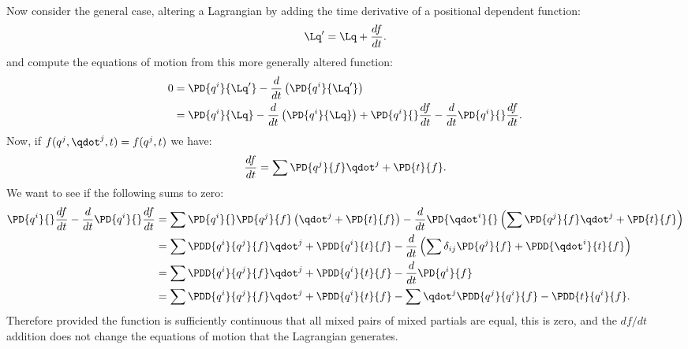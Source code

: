 {\begin{equation}
\begin{aligned}
\end{aligned}
\end{equation}
%
Now consider the general case, altering a Lagrangian by adding the time derivative of a positional dependent function:
%
\begin{equation}\label{eqn:tongMf1:1600}
\Lq' = \Lq + \frac{df}{dt}.
\end{equation}
%
and compute the equations of motion from this more generally altered function:
\begin{equation}\label{eqn:tongMf1:540}
\begin{aligned}
0
&= \PD{q^i}{\Lq'} - \frac{d}{dt}\left(\PD{q^i}{\Lq'}\right) \\
&= \PD{q^i}{\Lq} - \frac{d}{dt}\left(\PD{q^i}{\Lq}\right)
+ \PD{q^i}{}\frac{df}{dt} - \frac{d}{dt} \PD{q^i}{} \frac{df}{dt} .
\end{aligned}
\end{equation}
%
Now, if \(f(q^j,\qdot^j,t) = f(q^j,t)\) we have:
\begin{equation}\label{eqn:tongMf1:1620}
\frac{df}{dt} = \sum \PD{q^j}{f} \qdot^j + \PD{t}{f}.
\end{equation}
%
We want to see if the following sums to zero:
\begin{equation}\label{eqn:tongMf1:560}
\begin{aligned}
\PD{q^i}{}\frac{df}{dt} - \frac{d}{dt} \PD{q^i}{} \frac{df}{dt}
&= \sum \PD{q^i}{} \PD{q^j}{f} \left(\qdot^j + \PD{t}{f}\right) - \frac{d}{dt} \PD{\qdot^i}{} \left(\sum \PD{q^j}{f} \qdot^j + \PD{t}{f}\right) \\
&= \sum \PDD{q^i}{q^j}{f} \qdot^j + \PDD{q^i}{t}{f} - \frac{d}{dt} \left(\sum \delta_{ij} \PD{q^j}{f} + \PDD{\qdot^i}{t}{f}\right) \\
&= \sum \PDD{q^i}{q^j}{f} \qdot^j + \PDD{q^i}{t}{f} - \frac{d}{dt} \PD{q^i}{f} \\
&= \sum \PDD{q^i}{q^j}{f} \qdot^j + \PDD{q^i}{t}{f} - \sum \qdot^j \PDD{q^j}{q^i}{f} - \PDD{t}{q^i}{f} .
\end{aligned}
\end{equation}
%
Therefore provided the function is sufficiently continuous that all mixed pairs of mixed partials are equal, this is zero, and the \(df/dt\) addition does not
change the equations of motion that the Lagrangian generates.
%
}
